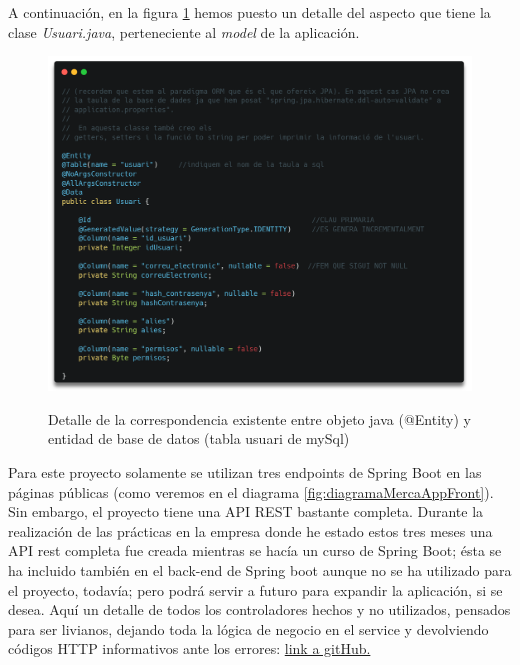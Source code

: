 \documentclass[a4paper,12pt]{report}
\begin{document}
				A continuación, en la figura \ref{fig:detallModelUsuariSBoot} hemos puesto un detalle del aspecto que tiene la clase \textit{Usuari.java}, perteneciente al \textit{model} de la aplicación.
				
				


				\FloatBarrier
				\setlength{\belowcaptionskip}{3pt}
				\begin{figure}[H]
					\centering
					\caption{Detalle de la correspondencia existente entre objeto java (@Entity) y entidad de base de datos (tabla usuari de mySql)}
					\includegraphics[width=1\linewidth]{img/detallModelUsuariSBoot}
					\label{fig:detallModelUsuariSBoot}
				\end{figure}
				\FloatBarrier
				
				Para este proyecto solamente se utilizan tres endpoints de Spring Boot en las páginas públicas (como veremos en el diagrama \ref{fig:diagramaMercaAppFront}). Sin embargo, el proyecto tiene una API REST bastante completa. Durante la realización de las prácticas en la empresa donde he estado estos tres meses una 
				API rest completa fue creada mientras se hacía un curso de Spring Boot; ésta se ha incluido también en el back-end de Spring boot aunque no se ha utilizado para el proyecto, todavía; pero podrá servir a futuro para expandir la aplicación, si se desea. Aquí un detalle de todos los controladores hechos y no utilizados, pensados para ser livianos, dejando toda la lógica de negocio en el service y devolviendo códigos HTTP informativos ante los errores: \href{https://github.com/blackcub3s/mercApp/blob/69c9dffc3a959f9b19b43eaf13236ba99250878e/APP%20WEB/__springboot__produccio__/app/src/main/java/miApp/app/Usuaris/controlador/UsuariControlador.java#L150-L274}{link a gitHub.}
				
\end{document}
